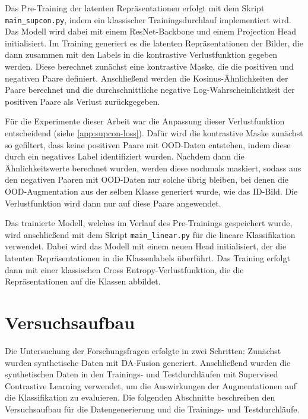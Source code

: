 Das Pre-Training der latenten Repräsentationen erfolgt mit dem Skript \lstinline{main_supcon.py}, indem ein klassischer Trainingsdurchlauf implementiert wird. Das Modell wird dabei mit einem ResNet-Backbone und einem Projection Head initialisiert. Im Training generiert es die latenten Repräsentationen der Bilder, die dann zusammen mit den Labels in die kontrastive Verlustfunktion gegeben werden. Diese berechnet zunächst eine kontrastive Maske, die die positiven und negativen Paare definiert. Anschließend werden die Kosinus-Ähnlichkeiten der Paare berechnet und die durchschnittliche negative Log-Wahrscheinlichtkeit der positiven Paare als Verlust zurückgegeben.

Für die Experimente dieser Arbeit war die Anpassung dieser Verlustfunktion entscheidend (siehe \autoref{app:supcon-loss}). Dafür wird die kontrastive Maske zunächst so gefiltert, dass keine positiven Paare mit OOD-Daten entstehen, indem diese durch ein negatives Label identifiziert wurden. Nachdem dann die Ähnlichkeitswerte berechnet wurden, werden diese nochmals maskiert, sodass aus den negativen Paaren mit OOD-Daten nur solche übrig bleiben, bei denen die OOD-Augmentation aus der selben Klasse generiert wurde, wie das ID-Bild. Die Verlustfunktion wird dann nur auf diese Paare angewendet.

Das trainierte Modell, welches im Verlauf des Pre-Trainings gespeichert wurde, wird anschließend mit dem Skript \lstinline{main_linear.py} für die lineare Klassifikation verwendet. Dabei wird das Modell mit einem neuen Head initialisiert, der die latenten Repräsentationen in die Klassenlabels überführt. Das Training erfolgt dann mit einer klassischen Cross Entropy-Verlustfunktion, die die Repräsentationen auf die Klassen abbildet.


\section{Versuchsaufbau} \label{sec:experiment-setup}

Die Untersuchung der Forschungsfragen erfolgte in zwei Schritten: Zunächst wurden synthetische Daten mit DA-Fusion generiert. Anschließend wurden die synthetischen Daten in den Trainings- und Testdurchläufen mit Supervised Contrastive Learning verwendet, um die Auswirkungen der Augmentationen auf die Klassifikation zu evaluieren. Die folgenden Abschnitte beschreiben den Versuchsaufbau für die Datengenerierung und die Trainings- und Testdurchläufe.

